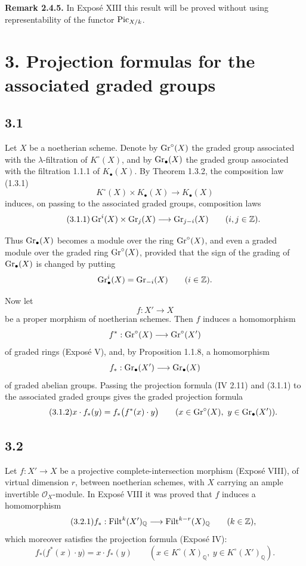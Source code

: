\textbf{Remark 2.4.5.}
In Expos\'e XIII this result will be proved without using representability of
the functor $\operatorname{Pic}_{X/k}$.

\section*{3. Projection formulas for the associated graded groups}

\subsection*{3.1}
Let $X$ be a noetherian scheme. Denote by $\operatorname{Gr}^{\circ}(X)$ the graded group associated
with the \mbox{$\lambda$-filtration} of $K^\circ(X)$, and by $\operatorname{Gr}_{\bullet}(X)$ the graded
group associated with the filtration 1.1.1 of $K_\bullet(X)$. By Theorem
1.3.2, the composition law (1.3.1)
\[
K^\circ(X)\times K_\bullet(X)\longrightarrow K_\bullet(X)
\]
induces, on passing to the associated graded groups, composition laws
\begin{equation}\tag{3.1.1}
\operatorname{Gr}^i(X)\times\operatorname{Gr}_j(X)\longrightarrow\operatorname{Gr}_{j-i}(X)
\qquad(i,j\in\mathbb Z).
\end{equation}

Thus $\operatorname{Gr}_{\bullet}(X)$ becomes a module over the ring $\operatorname{Gr}^{\circ}(X)$, and even a graded
module over the graded ring $\operatorname{Gr}^{\circ}(X)$, provided that the sign of the grading
of $\operatorname{Gr}_{\bullet}(X)$ is changed by putting
\[
\operatorname{Gr}^i_\bullet(X)=\operatorname{Gr}_{-i}(X)\qquad(i\in\mathbb Z).
\]

Now let
\[
f:X'\longrightarrow X
\]
be a proper morphism of noetherian schemes. Then $f$ induces a homomorphism
\[
f^*:\operatorname{Gr}^{\circ}(X)\longrightarrow\operatorname{Gr}^{\circ}(X')
\]
of graded rings (Expos\'e V), and, by Proposition 1.1.8, a homomorphism
\[
f_*:\operatorname{Gr}_{\bullet}(X')\longrightarrow\operatorname{Gr}_{\bullet}(X)
\]
of graded abelian groups. Passing the projection formula (IV 2.11) and
(3.1.1) to the associated graded groups gives the graded projection formula
\begin{equation}\tag{3.1.2}
x\cdot f_*(y)=f_*\bigl(f^*(x)\cdot y\bigr)
\qquad(x\in\operatorname{Gr}^{\circ}(X),\ y\in\operatorname{Gr}_{\bullet}(X')).
\end{equation}

\subsection*{3.2}
Let $f:X'\to X$ be a projective complete-intersection morphism (Expos\'e
VIII), of virtual dimension $r$, between noetherian schemes, with $X$ carrying
an ample invertible $\mathcal O_X$-module. In Expos\'e VIII it was proved that
$f$ induces a homomorphism
\begin{equation}\tag{3.2.1}
f_*:\operatorname{Filt}^k(X')_{\mathbb Q}\longrightarrow
\operatorname{Filt}^{k-r}(X)_{\mathbb Q}\qquad(k\in\mathbb Z),
\end{equation}
which moreover satisfies the projection formula (Expos\'e IV):
\begin{equation}\tag{3.2.2}
f_*\bigl(f^*(x)\cdot y\bigr)=x\cdot f_*(y)
\qquad(x\in K^\circ(X)_{\mathbb Q},\ y\in K^\circ(X')_{\mathbb Q}).
\end{equation}


